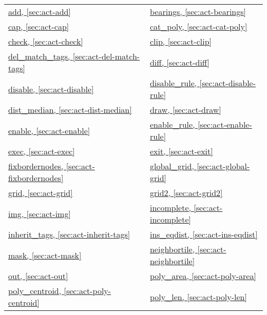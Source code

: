 \noindent\begin{tabular}{p{}p{}}
\hyperref[sec:act-add]{add, \ref*{sec:act-add}} & \hyperref[sec:act-bearings]{bearings, \ref*{sec:act-bearings}} \\
\hyperref[sec:act-cap]{cap, \ref*{sec:act-cap}} & \hyperref[sec:act-cat-poly]{cat\_poly, \ref*{sec:act-cat-poly}} \\
\hyperref[sec:act-check]{check, \ref*{sec:act-check}} & \hyperref[sec:act-clip]{clip, \ref*{sec:act-clip}} \\
\hyperref[sec:act-del-match-tags]{del\_match\_tags, \ref*{sec:act-del-match-tags}} & \hyperref[sec:act-diff]{diff, \ref*{sec:act-diff}} \\
\hyperref[sec:act-disable]{disable, \ref*{sec:act-disable}} & \hyperref[sec:act-disable-rule]{disable\_rule, \ref*{sec:act-disable-rule}} \\
\hyperref[sec:act-dist-median]{dist\_median, \ref*{sec:act-dist-median}} & \hyperref[sec:act-draw]{draw, \ref*{sec:act-draw}} \\
\hyperref[sec:act-enable]{enable, \ref*{sec:act-enable}} & \hyperref[sec:act-enable-rule]{enable\_rule, \ref*{sec:act-enable-rule}} \\
\hyperref[sec:act-exec]{exec, \ref*{sec:act-exec}} & \hyperref[sec:act-exit]{exit, \ref*{sec:act-exit}} \\
\hyperref[sec:act-fixbordernodes]{fixbordernodes, \ref*{sec:act-fixbordernodes}} & \hyperref[sec:act-global-grid]{global\_grid, \ref*{sec:act-global-grid}} \\
\hyperref[sec:act-grid]{grid, \ref*{sec:act-grid}} & \hyperref[sec:act-grid2]{grid2, \ref*{sec:act-grid2}} \\
\hyperref[sec:act-img]{img, \ref*{sec:act-img}} & \hyperref[sec:act-incomplete]{incomplete, \ref*{sec:act-incomplete}} \\
\hyperref[sec:act-inherit-tags]{inherit\_tags, \ref*{sec:act-inherit-tags}} & \hyperref[sec:act-ins-eqdist]{ins\_eqdist, \ref*{sec:act-ins-eqdist}} \\
\hyperref[sec:act-mask]{mask, \ref*{sec:act-mask}} & \hyperref[sec:act-neighbortile]{neighbortile, \ref*{sec:act-neighbortile}} \\
\hyperref[sec:act-out]{out, \ref*{sec:act-out}} & \hyperref[sec:act-poly-area]{poly\_area, \ref*{sec:act-poly-area}} \\
\hyperref[sec:act-poly-centroid]{poly\_centroid, \ref*{sec:act-poly-centroid}} & \hyperref[sec:act-poly-len]{poly\_len, \ref*{sec:act-poly-len}} \\

\end{tabular}

